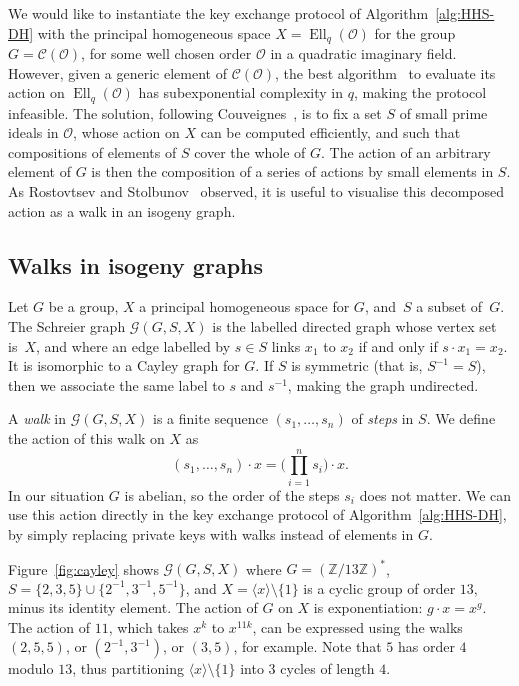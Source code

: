 \documentclass{llncs}
\newcommand{\Cl}{\mathcal{C}}
\newcommand{\Graph}{\mathcal{G}}
\renewcommand{\O}{\mathcal{O}}
\DeclareMathOperator{\Ell}{Ell}
\begin{document}
We would like to instantiate the key exchange protocol of
Algorithm~\ref{alg:HHS-DH} with the principal homogeneous space
$X = \Ell_q(\O)$ for the group $G = \Cl(\O)$, 
for some well chosen order $\O$ in a quadratic imaginary field. 
However, given a generic element of $\Cl(\O)$, 
the best algorithm~\cite{jao+soukharev10} to evaluate
its action on $\Ell_q(\O)$ has subexponential complexity in $q$,
making the protocol infeasible. 
The solution,
following Couveignes~\cite{cryptoeprint:2006:291},
is to fix a set $S$ of small prime ideals in $\O$,
whose action on $X$ can be computed efficiently,
and such that compositions of elements of $S$
cover the whole of $G$.
The action of an arbitrary element of $G$
is then the composition of a series of actions by small elements in $S$.
As Rostovtsev and Stolbunov~\cite{rostovtsev+stolbunov06} observed,
it is useful to visualise this decomposed action
as a walk in an isogeny graph.


\subsection{Walks in isogeny graphs}

Let $G$ be a group,
$X$ a principal homogeneous space for $G$,
and~$S$ a subset of~$G$.
The Schreier graph $\Graph(G,S,X)$
is the labelled directed graph whose vertex set is~$X$, 
and where an edge labelled by $s∈S$
links $x_1$ to $x_2$ if and only if $s\cdot x_1 = x_2$.
It is isomorphic to a Cayley graph for $G$.
If $S$ is symmetric (that is, $S^{-1}=S$), 
then we associate the same label to $s$ and $s^{-1}$, 
making the graph undirected.

A \emph{walk} in $\Graph(G,S,X)$ is a finite sequence
$(s_1,\ldots,s_n)$ of \emph{steps} in $S$. 
We define the action of this walk on $X$ as
\[
    (s_1,\ldots,s_n)·x 
    = 
    \big(\prod_{i=1}^n s_i\big)·x.
\]
In our situation $G$ is abelian,
so the order of the steps $s_i$ does not matter.
We can use this action directly in the key exchange protocol
of Algorithm~\ref{alg:HHS-DH},
by simply replacing private keys with walks instead of elements in $G$.

\begin{example}
Figure~\ref{fig:cayley}
shows $\Graph(G,S,X)$ where $G=(ℤ/13ℤ)^*$, 
$S = \{2,3,5\}\cup\{2^{-1},3^{-1},5^{-1}\}$,
and $X = \langle{x}\rangle\setminus\{1\}$ 
is a cyclic group of order $13$, minus its identity element.
The action of $G$ on $X$ is exponentiation: $g·x=x^g$.
The action of $11$, which takes $x^k$ to $x^{11k}$,
can be expressed using the walks 
$(2,5,5)$,
or $(2^{-1},3^{-1})$,
or $(3,5)$,
for example.  Note that $5$ has order $4$ modulo
$13$, thus partitioning $〈x〉\setminus\{1\}$ into $3$ cycles of
length $4$.
\end{example}
\end{document}
